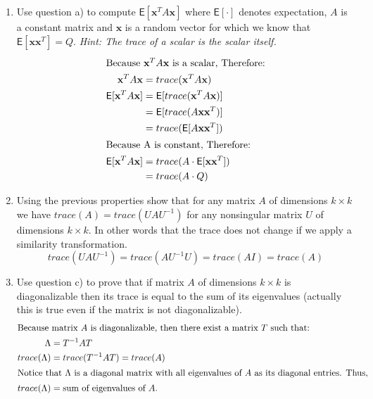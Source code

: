 \documentclass[letter, 11pt]{article}
\begin{document}
\begin{enumerate}[wide = 0pt, label = \textbf{Problem \arabic*:}]
\begin{enumerate}
			\item {Use question a) to compute $ \mathsf{E}[\textbf{x}^T A\textbf{x}] $ where $ \mathsf{E}[\cdot] $ denotes expectation, $ A $ is a constant matrix and $ \textbf{x} $ is a random vector for which we know that $ \mathsf{E}[\textbf{xx}^T ] = Q $. \textit{Hint: The trace of a scalar is the scalar itself.}} 
			\begin{align*}
				\shortintertext{Because $ \textbf{x}^T A\textbf{x} $ is a scalar, Therefore:}
				\textbf{x}^T A\textbf{x} &= trace(\textbf{x}^T A\textbf{x}) \\
				\mathsf{E}[\textbf{x}^T A\textbf{x}] &= \mathsf{E}[trace(\textbf{x}^T A\textbf{x})] \\
				&= \mathsf{E}[trace(A\textbf{x} \textbf{x}^T)] \\
				&= trace(\mathsf{E}[A\textbf{x} \textbf{x}^T]) \\
				\shortintertext{Because A is constant, Therefore:} 
				\mathsf{E}[\textbf{x}^T A\textbf{x}] &= trace(A \cdot \mathsf{E}[\textbf{x} \textbf{x}^T]) \\
				&= trace(A \cdot Q)
			\end{align*}
			
			\item {Using the previous properties show that for any matrix $ A $ of dimensions $ k \times k $ we have $ trace(A) = trace(U AU^{-1}) $ for any nonsingular matrix $ U $ of dimensions $ k \times k $. In other words that the trace does not change if we apply a similarity transformation.} 
			\begin{equation*}
				trace(U AU^{-1}) = trace(AU^{-1}U) = trace(AI) = trace(A)
			\end{equation*}
			
			\item {Use question c) to
				prove that if matrix $ A $ of dimensions $ k \times k $ is diagonalizable then its trace is equal to the sum of its eigenvalues
				(actually this is true even if the matrix is not diagonalizable).}
			\begin{align*}
				\shortintertext{Because matrix $ A $ is diagonalizable, then there exist a matrix $ T $ such that:}
				\Lambda &= T^{-1}AT \\
				trace(\Lambda) &= trace(T^{-1}AT) = trace(A) \\
				\shortintertext{Notice that $ \Lambda $ is a diagonal matrix with all eigenvalues of $ A $ as its diagonal entries. Thus, } 
				trace(\Lambda) &= \text{sum of eigenvalues of $ A $.}  
			\end{align*}
			

\end{enumerate}
\end{enumerate}
\end{document}
